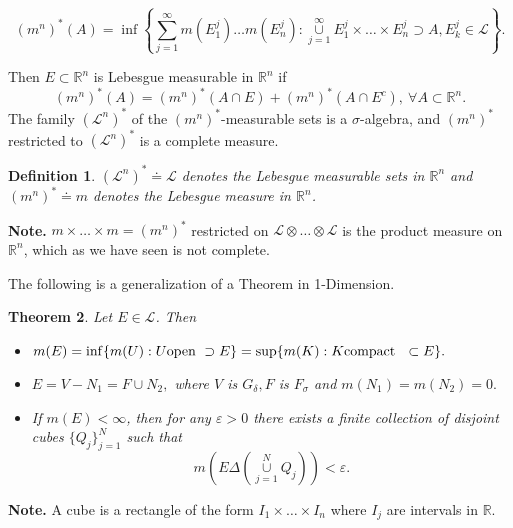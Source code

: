 \documentclass[12pt]{report}
\newtheorem{theorem}{Theorem}[section]
\newtheorem{definition}[theorem]{Definition}
\begin{document}
\[
(m^n)^*(A) = \inf \left \{\sum^\infty_{j=1} m(E^j_1) \dots m(E^j_n):
\overset{\infty}{\underset{j=1}{\cup}} E^j_1 \times \dots \times E^j_n
 \supset A, E^j_k \in \mathcal{L}\right \}.
\]

Then $E \subset \mathbb{R}^n$ is Lebesgue measurable in $\mathbb{R}^n$
if
\[
(m^n)^* (A) = (m^n)^* (A \cap E) + (m^n)^* (A \cap E^c), \ \forall A
\subset \mathbb{R}^n.
\]
The family $(\mathcal{L}^n)^*$ of the $(m^n)^*$-measurable sets is a 
$\sigma$-algebra, and $(m^n)^*$ restricted to $(\mathcal{L}^n)^*$ is a
complete measure. 

\begin{definition}  $(\mathcal{L}^n)^* \doteq \mathcal{L}$ denotes the
Lebesgue measurable sets in $\mathbb{R}^n$ and $(m^n)^* \doteq m$
denotes the Lebesgue measure in $\mathbb{R}^n$.
\end{definition}

\vspace{.25cm}
\noindent
\textbf{Note.} $m \times \dots \times m = (m^n)^*$ restricted on
$\mathcal{L} \otimes \dots \otimes \mathcal{L}$ is the product measure
on $\mathbb{R}^n$, which as we have seen is not complete.

\vspace{.20cm}
\noindent
The following is a generalization of a Theorem in 1-Dimension.

\begin{theorem}  Let $E \in \mathcal{L}$.  Then
\begin{itemize}
\item[(a)]  
$\displaystyle m(E) = \inf \{m (U): U \mbox{\text{open }}\supset E\}
= \mbox{sup} \{m(K): K \mbox{\text{compact } } \subset
E\}.$
\item[(b)]  $E = V - N_1 = F\cup N_2,$ \textit{where $V$ is $G_\delta, F$
is $F_\sigma$ and $m(N_1) = m(N_2) = 0.$}
\item[(c)]  \textit{If $m(E) < \infty$, then for any $\varepsilon > 0$  there
exists a finite collection of disjoint  cubes $\{Q_j\}^N_{j=1}$ such that}
\[
m\left (E \Delta (\overset{N}{\underset{j=1}{\cup}} Q_j)
\right ) < \varepsilon.
\]
\end{itemize}
\end{theorem}

\vspace{.25cm}
\noindent
\textbf{Note.}  A cube is a rectangle of the form $I_1 \times \dots
\times I_n$ where $I_j$ are intervals in $\mathbb{R}$.
\end{document}

